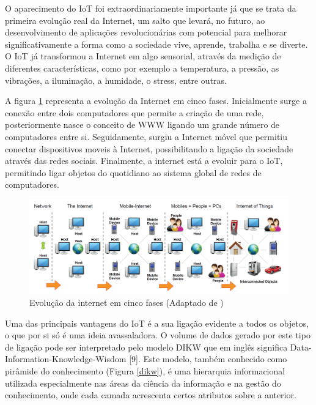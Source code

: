O aparecimento do IoT foi extraordinariamente importante já que se trata da primeira evolução real da Internet, um salto que levará, no futuro, ao desenvolvimento de aplicações revolucionárias com potencial para melhorar significativamente a forma como a sociedade vive, aprende, trabalha e se diverte. O IoT já transformou a Internet em algo sensorial, através da medição de diferentes características, como por exemplo a temperatura, a pressão, as vibrações, a iluminação, a humidade, o stress, entre outras. 

A figura \ref{iotEvolution} representa a evolução da Internet em cinco fases. Inicialmente surge a conexão entre dois computadores que permite a criação de uma rede, posteriormente nasce o conceito de \ac{WWW} ligando um grande número de computadores entre si. Seguidamente, surgiu a Internet móvel que permitiu conectar dispositivos moveis à Internet, possibilitando a ligação da sociedade através das redes sociais.
Finalmente, a internet está a evoluir para o \ac{IoT}, permitindo ligar objetos do quotidiano ao sistema global de redes de computadores.






\begin{figure}[!htb]
	\centering
	\includegraphics[scale=0.5]{img/cap3-iot/diagrama-evolution.png}
	\caption{Evolução da internet em cinco fases (Adaptado de \cite{Our2013})}
	\label{iotEvolution}
\end{figure}



Uma das principais vantagens do IoT é a sua ligação evidente a todos os objetos, o que por si só é uma ideia avassaladora. O volume de dados gerado por este tipo de ligação pode ser interpretado pelo modelo DIKW que em inglês significa Data-Information-Knowledge-Wisdom [9]. Este modelo, também conhecido como pirâmide do conhecimento (Figura \ref{dikw}), é uma hierarquia informacional utilizada especialmente nas áreas da ciência da informação e na gestão do conhecimento, onde cada camada acrescenta certos atributos sobre a anterior.


